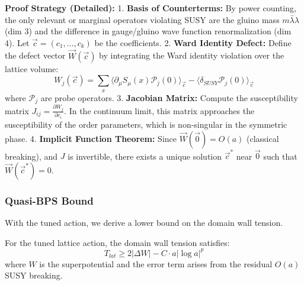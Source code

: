 \textbf{Proof Strategy (Detailed):}
1.  \textbf{Basis of Counterterms:} By power counting, the only relevant or marginal operators violating SUSY are the gluino mass $m \bar{\lambda}\lambda$ (dim 3) and the difference in gauge/gluino wave function renormalization (dim 4). Let $\vec{c} = (c_1, \dots, c_k)$ be the coefficients.
2.  \textbf{Ward Identity Defect:} Define the defect vector $\vec{W}(\vec{c})$ by integrating the Ward identity violation over the lattice volume:
    \begin{equation}
    W_j(\vec{c}) = \sum_x \langle \partial_\mu S_\mu(x) \mathcal{P}_j(0) \rangle_{\vec{c}} - \langle \delta_{SUSY} \mathcal{P}_j(0) \rangle_{\vec{c}}
    \end{equation}
    where $\mathcal{P}_j$ are probe operators.
3.  \textbf{Jacobian Matrix:} Compute the susceptibility matrix $J_{ij} = \frac{\partial W_j}{\partial c_i}$. In the continuum limit, this matrix approaches the susceptibility of the order parameters, which is non-singular in the symmetric phase.
4.  \textbf{Implicit Function Theorem:} Since $\vec{W}(\vec{0}) = O(a)$ (classical breaking), and $J$ is invertible, there exists a unique solution $\vec{c}^*$ near $\vec{0}$ such that $\vec{W}(\vec{c}^*) = 0$.

\subsubsection{Quasi-BPS Bound}

With the tuned action, we derive a lower bound on the domain wall tension.

\begin{proposition}
For the tuned lattice action, the domain wall tension satisfies:
\begin{equation}
T_{lat} \ge 2 |\Delta W| - C \cdot a |\log a|^p
\end{equation}
where $W$ is the superpotential and the error term arises from the residual $O(a)$ SUSY breaking.
\end{proposition}

